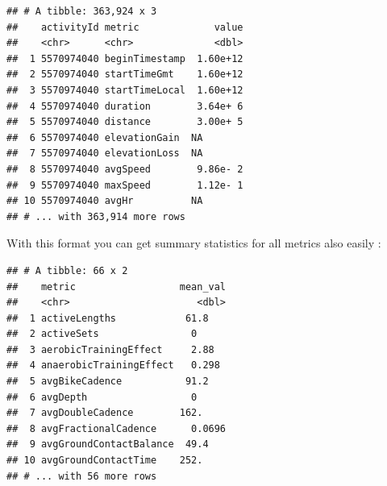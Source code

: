 \documentclass[
]{book}
\newenvironment{Shaded}{\begin{snugshade}}{\end{snugshade}}
\newcommand{\DataTypeTok}[1]{\textcolor[rgb]{0.13,0.29,0.53}{#1}}
\newcommand{\KeywordTok}[1]{\textcolor[rgb]{0.13,0.29,0.53}{\textbf{#1}}}
\newcommand{\NormalTok}[1]{#1}
\newcommand{\OperatorTok}[1]{\textcolor[rgb]{0.81,0.36,0.00}{\textbf{#1}}}
\newcommand{\StringTok}[1]{\textcolor[rgb]{0.31,0.60,0.02}{#1}}
\begin{document}
\begin{Shaded}
\end{Shaded}

\begin{verbatim}
## # A tibble: 363,924 x 3
##    activityId metric             value
##    <chr>      <chr>              <dbl>
##  1 5570974040 beginTimestamp  1.60e+12
##  2 5570974040 startTimeGmt    1.60e+12
##  3 5570974040 startTimeLocal  1.60e+12
##  4 5570974040 duration        3.64e+ 6
##  5 5570974040 distance        3.00e+ 5
##  6 5570974040 elevationGain  NA       
##  7 5570974040 elevationLoss  NA       
##  8 5570974040 avgSpeed        9.86e- 2
##  9 5570974040 maxSpeed        1.12e- 1
## 10 5570974040 avgHr          NA       
## # ... with 363,914 more rows
\end{verbatim}

With this format you can get summary statistics for all metrics also easily :

\begin{Shaded}
\end{Shaded}

\begin{verbatim}
## # A tibble: 66 x 2
##    metric                  mean_val
##    <chr>                      <dbl>
##  1 activeLengths            61.8   
##  2 activeSets                0     
##  3 aerobicTrainingEffect     2.88  
##  4 anaerobicTrainingEffect   0.298 
##  5 avgBikeCadence           91.2   
##  6 avgDepth                  0     
##  7 avgDoubleCadence        162.    
##  8 avgFractionalCadence      0.0696
##  9 avgGroundContactBalance  49.4   
## 10 avgGroundContactTime    252.    
## # ... with 56 more rows
\end{verbatim}
\end{document}
